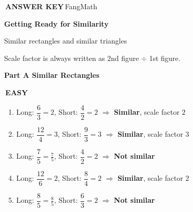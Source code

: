\documentclass[11pt]{article}
\newcommand{\badge}[1]{\colorbox{fmtitle}{\color{white}\bfseries\small\,#1\,}}
\newcommand{\parttitle}[2]{\needspace{6cm}\vspace{4mm}%
  {\colorbox{fmtitle}{\parbox{\dimexpr\linewidth-2\fboxsep}{\color{white}\bfseries\large Part #1 \quad #2}}}\par\vspace{3mm}}
\newcommand{\ans}[1]{\textcolor{fmans}{\textbf{#1}}}
\newcommand{\leveltag}[2]{\colorbox{#1}{\color{white}\bfseries\small\,#2\,}}
\begin{document}
\badge{ANSWER KEY}\hfill{\color{fmgray}\small FangMath}\par\vspace{3mm}
{\color{fmtitle}\bfseries\LARGE Getting Ready for Similarity}\par\vspace{1mm}
{\color{fmgray}\large Similar rectangles and similar triangles}\par\vspace{2mm}
{\small\color{fmgray}Scale factor is always written as 2nd figure $\div$ 1st figure.}\par\vspace{2mm}

\parttitle{A}{Similar Rectangles}
\leveltag{fmwatch}{EASY}\par\vspace{1mm}
\begin{enumerate}[label=\textbf{\arabic*.},start=1,itemsep=2mm,leftmargin=*]
\item Long: $\dfrac{6}{3} = 2$, \; Short: $\dfrac{4}{2} = 2$ \;$\Rightarrow$\; \ans{Similar}, scale factor \ans{$2$}
\item Long: $\dfrac{12}{4} = 3$, \; Short: $\dfrac{9}{3} = 3$ \;$\Rightarrow$\; \ans{Similar}, scale factor \ans{$3$}
\item Long: $\dfrac{7}{5} = \tfrac{7}{5}$, \; Short: $\dfrac{4}{2} = 2$ \;$\Rightarrow$\; \ans{Not similar}
\item Long: $\dfrac{12}{6} = 2$, \; Short: $\dfrac{8}{4} = 2$ \;$\Rightarrow$\; \ans{Similar}, scale factor \ans{$2$}
\item Long: $\dfrac{8}{5} = \tfrac{8}{5}$, \; Short: $\dfrac{6}{3} = 2$ \;$\Rightarrow$\; \ans{Not similar}
\end{enumerate}
\end{document}
